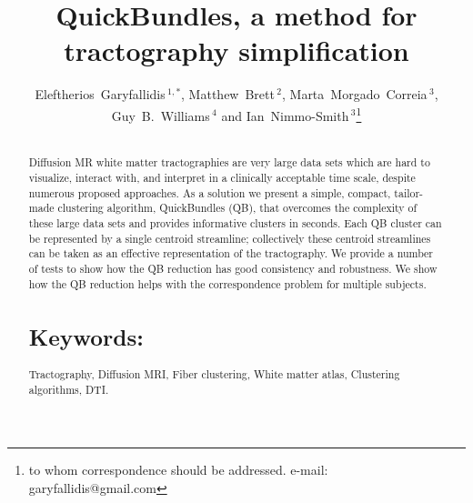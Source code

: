\documentclass{bioinfo}
\begin{document}

\title[QuickBundles]{QuickBundles, a method for tractography simplification}

\author[Garyfallidis, Brett, Correia, Williams and
Nimmo-Smith]{Eleftherios~Garyfallidis\,$^{1,*}$, Matthew~Brett\,$^{2}$,
  Marta~Morgado~Correia\,$^{3}$, Guy~B.~Williams\,$^{4}$ and
  Ian~Nimmo-Smith\,$^{3}$\footnote{to whom correspondence should be
    addressed. e-mail: garyfallidis@gmail.com}}

\address{\,$^{1}$Wolfson College, University of Cambridge, Cambridge, UK\\
  \,$^{2}$University of California, Henry H. Wheeler, Jr. Brain Imaging Center, Berkeley, CA.\\
  \,$^{3}$MRC Cognition and Brain Sciences Unit, Cambridge, UK.\\
  \,$^{4}$Wolfson Brain Imaging Centre, University of Cambridge,
  Cambridge, UK.}


\history{}

\editor{}

\maketitle

\begin{abstract}

\section{}
Diffusion MR white matter tractographies are very large data sets which
are hard to visualize, interact with, and interpret in a clinically
acceptable time scale, despite numerous proposed approaches. As a
solution we present a simple, compact, tailor-made clustering algorithm,
QuickBundles (QB), that overcomes the complexity of these large data
sets and provides informative clusters in seconds. Each QB cluster can
be represented by a single centroid streamline; collectively these
centroid streamlines can be taken as an effective representation of the
tractography. We provide a number of tests to show how the QB reduction
has good consistency and robustness. We show how the QB reduction helps
with the correspondence problem for multiple subjects.



\section{Keywords:} Tractography, Diffusion MRI, Fiber clustering, White
matter atlas,
Clustering algorithms, DTI.

\end{abstract}
\end{document}
